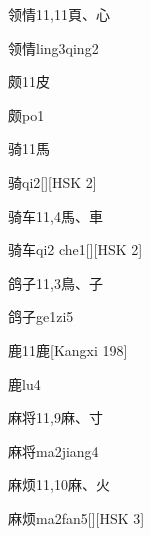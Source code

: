 \begin{entry}{领情}{11,11}{⾴、⼼}
  \begin{phonetics}{领情}{ling3qing2}
  \end{phonetics}
\end{entry}

\begin{entry}{颇}{11}{⽪}
  \begin{phonetics}{颇}{po1}
  \end{phonetics}
\end{entry}

\begin{entry}{骑}{11}{⾺}
  \begin{phonetics}{骑}{qi2}[][HSK 2]
  \end{phonetics}
\end{entry}

\begin{entry}{骑车}{11,4}{⾺、⾞}
  \begin{phonetics}{骑车}{qi2 che1}[][HSK 2]
  \end{phonetics}
\end{entry}

\begin{entry}{鸽子}{11,3}{⿃、⼦}
  \begin{phonetics}{鸽子}{ge1zi5}
  \end{phonetics}
\end{entry}

\begin{entry}{鹿}{11}{⿅}[Kangxi 198]
  \begin{phonetics}{鹿}{lu4}
  \end{phonetics}
\end{entry}

\begin{entry}{麻将}{11,9}{⿇、⼨}
  \begin{phonetics}{麻将}{ma2jiang4}
  \end{phonetics}
\end{entry}

\begin{entry}{麻烦}{11,10}{⿇、⽕}
  \begin{phonetics}{麻烦}{ma2fan5}[][HSK 3]
  \end{phonetics}
\end{entry}


